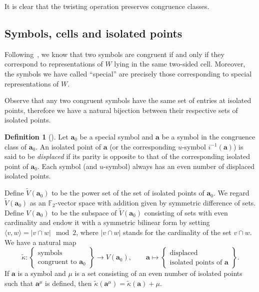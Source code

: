 \documentclass{amsart}
\theoremstyle{definition}
\newtheorem{definition}[theorem]{Definition}
\newcommand{\F}{\mathbb{F}}
\newcommand{\ba}{\mathbf{a}}
\newcommand{\0}{\mathcal{O}}
\begin{document}
It is clear that the twisting operation preserves congruence
classes.


\subsection{Symbols, cells and isolated points}

Following~\cite{Lusztig:special}, we know that two symbols are congruent if and only if
they correspond to representations of $W$ lying in the same two-sided cell.
Moreover, the symbols we have called ``special'' are precisely those
corresponding to special representations of $W$. 

Observe that any two congruent symbols have the same set of entries at
isolated points, therefore we have a natural bijection between their respective sets of isolated points.  

\begin{definition}[{\cite[Definition 3.6]{Achar-Sage-special}}]
	Let $\ba_0$ be a special symbol and $\ba$ be a symbol in the congruence class of $\ba_0$.  An isolated point of $\ba$ (or the corresponding $u$-symbol $i^{-1}(\ba)$) is said to be \emph{displaced} if its parity is opposite to that of the corresponding isolated point of $\ba_0$.  Each symbol (and
	$u$-symbol) always has an even number of displaced
	isolated points. 
\end{definition}


Define $\tilde V(\ba_0)$ to be the power set of the set of isolated points of $\ba_0$. We regard $\tilde V(\ba_0)$ as an $\F_2$-vector space with addition given by symmetric difference of sets.  Define $V(\ba_0)$ to be the subspace of $\tilde V(\ba_0)$ consisting of sets with even cardinality and endow it with a symmetric bilinear form by setting $\langle v, w \rangle = |v \cap w| \mod 2$, where $|v \cap w|$ stands for the cardinality of the set $v \cap w$. We have a natural map
\[
\tilde\kappa:
\left\{\begin{array}{c}
	\text{symbols}\\
	\text{congruent to $\ba_0$}
\end{array}\right\}
\to V(\ba_0),
\qquad
\ba \mapsto
\left\{\begin{array}{c}
	\text{displaced}\\
	\text{isolated points of $\ba$}
\end{array}\right\}.
\]
If $\ba$ is a symbol and $\mu$ is a set
consisting of an even number of isolated points such that $\ba^\mu$ is
defined, then
$\tilde\kappa(\ba^\mu) = \tilde\kappa(\ba) + \mu$. 
\end{document}
